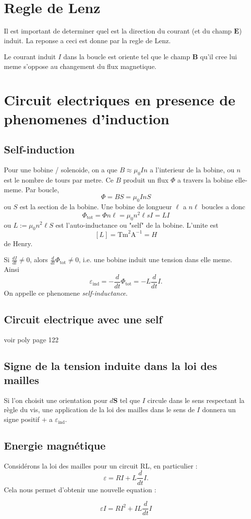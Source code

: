 \section{Regle de Lenz}
Il est important de determiner quel est la direction du courant (et du champ $\boldsymbol{E}$) induit. La reponse a ceci est donne par la regle de Lenz.
\begin{theorem}
Le courant induit $I$ dans la boucle est oriente tel que le champ $\boldsymbol{B}$ qu'il cree lui meme s'oppose au changement du flux magnetique.
\end{theorem}
\section{Circuit electriques en presence de phenomenes d'induction}
\subsection{Self-induction}

Pour une bobine / solenoide, on a que $B\approx \mu_{0}In$ a l'interieur de la bobine, ou $n$ est le nombre de tours par metre. Ce $B$ produit un flux $\Phi$ a travers la bobine elle-meme. Par boucle, 
$$
\Phi=BS=\mu_{0}InS
$$
ou $S$ est la section de la bobine. Une bobine de longueur $\ell$ a $n\ell$ boucles a donc
$$
\Phi _{\mathrm{ t o t}}=\Phi n\ell=\mu_{0}n^{2}\ell sI=LI
$$
ou $L:=\mu_{0}n^{2}\ell S$ est l'auto-inductance ou "self" de la bobine. L'unite est
$$
[L]=\mathrm{Tm}^{2}\mathrm{A}^{-1}=H
$$
de Henry. 

Si $\frac{dI}{dt}\neq0$, alors $\frac{d}{dt}\Phi _{\mathrm{t ot}}\neq 0$, i.e. une bobine induit une tension dans elle meme. Ainsi 
$$
\varepsilon _{\mathrm{ind}}=-\frac{d}{dt}\Phi _{\mathrm{tot}}=-L\frac{d}{dt} I.
$$
On appelle ce phenomene \emph{self-inductance}.
\subsection{Circuit electrique avec une self}
voir poly page 122
\subsection{Signe de la tension induite dans la loi des mailles}
Si l'on choisit une orientation pour $d\boldsymbol{S}$ tel que $I$ circule dans le sens respectant la règle du vis, une application de la loi des mailles dans le sens de $I$ donnera un signe positif $+$ a $\varepsilon _{\mathrm{ind}}$.
\subsection{Energie magnétique}
Considérons la loi des mailles pour un circuit RL, en particulier :
$$
\varepsilon=RI + L \frac{d}{dt}I.
$$
Cela nous permet d'obtenir une nouvelle equation :
\begin{theorem}
$$
\varepsilon I=RI^{2}+IL\frac{d}{dt} I
$$
\end{theorem}
